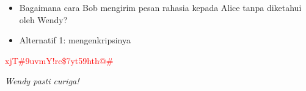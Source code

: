 \documentclass{article}
\begin{document}

\begin{itemize}
    \item Bagaimana cara Bob mengirim pesan rahasia kepada Alice tanpa diketahui oleh Wendy?
    \item Alternatif 1: mengenkripsinya
\end{itemize}

\vspace{5mm}

\textcolor{red}{xjT\#9uvmY!rc\$7yt59hth@\#}

\vspace{5mm}

\textit{Wendy pasti curiga!}
\end{document}
